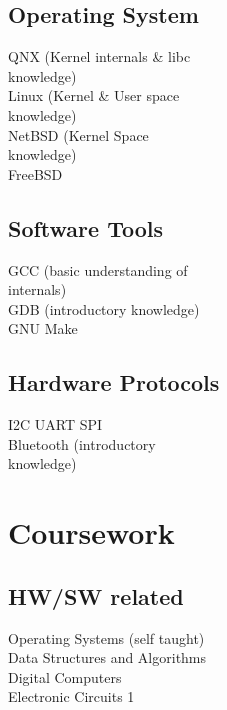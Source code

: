 \documentclass[letterpaper, 10pt]{deedy-resume} %
\begin{document}
{\begin{minipage}[t]{0.30\textwidth}
\sectionspace

\subsection{Operating System}
\textbullet{} QNX (Kernel internals \& libc \\
\hspace{2mm} knowledge) \\
\textbullet{} Linux (Kernel \& User space \\
\hspace{2mm} knowledge) \\
\textbullet{} NetBSD (Kernel Space \\
\hspace{2mm} knowledge) \\
\textbullet{} FreeBSD \\
\sectionspace %
\subsection{Software Tools}
\textbullet{} GCC (basic understanding of \\
\hspace{2mm} internals) \\ 
\textbullet{} GDB (introductory knowledge)\\
\textbullet{} GNU Make \\

\sectionspace %

\subsection{Hardware Protocols}

\textbullet{} I2C \textbullet{} UART \textbullet{} SPI \\
\textbullet{} Bluetooth (introductory \\ 
\hspace{2mm} knowledge) \\
\sectionspace %


\section{Coursework}
\subsection{HW/SW related}
\textbullet{} Operating Systems (self taught) \\
\textbullet{} Data Structures and Algorithms \\
\textbullet{} Digital Computers \\
\textbullet{} Electronic Circuits 1\\
\sectionspace %


\end{minipage}}
\end{document}
